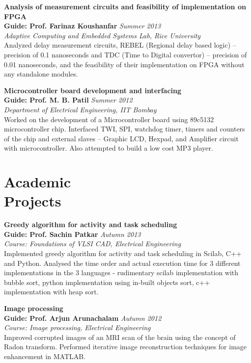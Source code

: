 \documentclass[margin,line]{resume}
\begin{document}
\begin{resume}
    {\bf Analysis of measurement circuits and feasibility of implementation on FPGA} \\
    {\bf Guide: Prof. Farinaz Koushanfar} \hfill \textit{Summer 2013} \\
    {\it Adaptive Computing and Embedded Systems Lab, Rice University} \\
    Analyzed delay measurement circuits, REBEL (Regional delay based  logic) – precision of 0.1 nanoseconds and TDC (Time to Digital convertor) – precision of 0.01 nanoseconds, and the feasibility of their implementation on FPGA without any standalone modules.
	
    {\bf Microcontroller board development and interfacing} \\
    {\bf Guide: Prof. M. B. Patil} 	\hfill \textit{Summer 2012} \\
    {\it Department of Electrical Engineering, IIT Bombay}\\
	Worked on the development of a Microcontroller board using 89c5132 microcontroller chip. Interfaced TWI, SPI, watchdog timer, timers and counters of the chip and external slaves – Graphic LCD, Hexpad, and Amplifier circuit with microcontroller. Also attempted to build a low cost MP3 player.
	
\section{\mysidestyle Academic \\ Projects}
	\vspace{0mm}
	
	{\bf Greedy algorithm for activity and task scheduling} \\
    {\bf Guide: Prof. Sachin Patkar} 	\hfill \textit{Autumn 2013} \\
    { \it Course: Foundations of VLSI CAD, Electrical Engineering}\\
	Implemented greedy algorithm for activity and task scheduling in Scilab, C++ and Python. Analysed the time order and actual execution time for 3 different implementations in the 3 languages - rudimentary scilab implementation with bubble sort, python implementation using in-built objects sort, c++ implementation with heap sort.
	
	{\bf Image processing} \\
    {\bf Guide: Prof. Arjun Arunachalam} 	\hfill \textit{Autumn 2012} \\
    { \it Course: Image processing, Electrical Engineering}\\
	Improved corrupted images of an MRI scan of the brain using the concept of Radon transform. Performed iterative image reconstruction techniques for image enhancement in MATLAB.
	

\end{resume}
\end{document}
